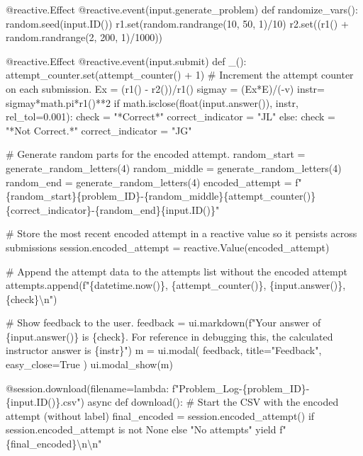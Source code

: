 \documentclass[
  letterpaper,
  DIV=11,
  numbers=noendperiod]{scrreprt}
\newenvironment{Shaded}{\begin{snugshade}}{\end{snugshade}}
\newcommand{\NormalTok}[1]{\textcolor[rgb]{0.00,0.23,0.31}{#1}}
\begin{document}
\begin{Shaded}
\begin{Highlighting}[]
\NormalTok{    @reactive.Effect}
\NormalTok{    @reactive.event(input.generate\_problem)}
\NormalTok{    def randomize\_vars():}
\NormalTok{        random.seed(input.ID())}
\NormalTok{        r1.set(random.randrange(10, 50, 1)/10)}
\NormalTok{        r2.set((r1() + random.randrange(2, 200, 1)/1000))}
        
\NormalTok{    @reactive.Effect}
\NormalTok{    @reactive.event(input.submit)}
\NormalTok{    def \_():}
\NormalTok{        attempt\_counter.set(attempt\_counter() + 1)  \# Increment the attempt counter on each submission.}
\NormalTok{        Ex = (r1() {-} r2())/r1()}
\NormalTok{        sigmay = (Ex*E)/({-}v)}
\NormalTok{        instr= sigmay*math.pi*r1()**2}
\NormalTok{        if math.isclose(float(input.answer()), instr, rel\_tol=0.001):}
\NormalTok{            check = "*Correct*"}
\NormalTok{            correct\_indicator = "JL"}
\NormalTok{        else:}
\NormalTok{            check = "*Not Correct.*"}
\NormalTok{            correct\_indicator = "JG"}

\NormalTok{        \# Generate random parts for the encoded attempt.}
\NormalTok{        random\_start = generate\_random\_letters(4)}
\NormalTok{        random\_middle = generate\_random\_letters(4)}
\NormalTok{        random\_end = generate\_random\_letters(4)}
\NormalTok{        encoded\_attempt = f"\{random\_start\}\{problem\_ID\}{-}\{random\_middle\}\{attempt\_counter()\}\{correct\_indicator\}{-}\{random\_end\}\{input.ID()\}"}

\NormalTok{        \# Store the most recent encoded attempt in a reactive value so it persists across submissions}
\NormalTok{        session.encoded\_attempt = reactive.Value(encoded\_attempt)}

\NormalTok{        \# Append the attempt data to the attempts list without the encoded attempt}
\NormalTok{        attempts.append(f"\{datetime.now()\}, \{attempt\_counter()\}, \{input.answer()\}, \{check\}\textbackslash{}n")}

\NormalTok{        \# Show feedback to the user.}
\NormalTok{        feedback = ui.markdown(f"Your answer of \{input.answer()\} is \{check\}. For reference in debugging this, the calculated instructor answer is \{instr\}")}
\NormalTok{        m = ui.modal(}
\NormalTok{            feedback,}
\NormalTok{            title="Feedback",}
\NormalTok{            easy\_close=True}
\NormalTok{        )}
\NormalTok{        ui.modal\_show(m)}

\NormalTok{    @session.download(filename=lambda: f"Problem\_Log{-}\{problem\_ID\}{-}\{input.ID()\}.csv")}
\NormalTok{    async def download():}
\NormalTok{        \# Start the CSV with the encoded attempt (without label)}
\NormalTok{        final\_encoded = session.encoded\_attempt() if session.encoded\_attempt is not None else "No attempts"}
\NormalTok{        yield f"\{final\_encoded\}\textbackslash{}n\textbackslash{}n"}
        

\end{Highlighting}
\end{Shaded}
\end{document}
